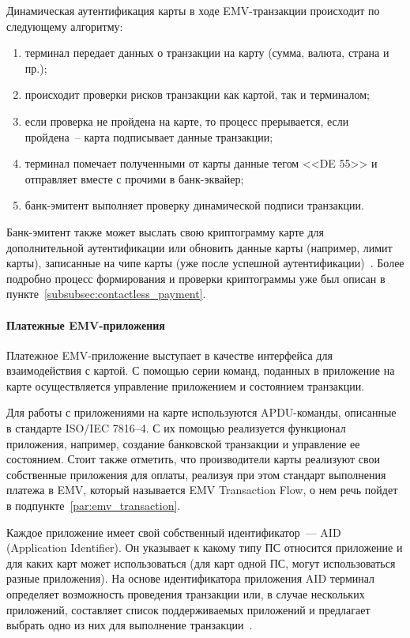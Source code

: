 Динамическая аутентификация карты в ходе EMV-транзакции происходит по следующему алгоритму:

\begin{enumerate}
    \item терминал передает данных о транзакции на карту (сумма, валюта, страна и пр.);
    \item происходит проверки рисков транзакции как картой, так и терминалом;
    \item если проверка не пройдена на карте, то процесс прерывается, если пройдена~-- карта подписывает данные транзакции;
    \item терминал помечает полученными от карты данные тегом <<DE 55>> и отправляет вместе с прочими в банк-эквайер;
    \item банк-эмитент выполняет проверку динамической подписи транзакции.
\end{enumerate}

Банк-эмитент также может выслать свою криптограмму карте для дополнительной аутентификации или обновить данные карты (например, лимит карты), записанные на чипе карты (уже после успешной аутентификации)~\cite{emv_book_2}.
Более подробно процесс формирования и проверки криптограммы уже был описан в пункте~\ref{subsubsec:contactless_payment}.


\paragraph{Платежные EMV-приложения}

Платежное EMV-приложение выступает в качестве интерфейса для взаимодействия с картой.
С помощью серии команд, поданных в приложение на карте осуществляется управление приложением и состоянием транзакции.

Для работы с приложениями на карте используются APDU-команды, описанные в стандарте ISO/IEC 7816--4.
С их помощью реализуется функционал приложения, например, создание банковской транзакции и управление ее состоянием.
Стоит также отметить, что производители карты реализуют свои собственные приложения для оплаты, реализуя при этом стандарт выполнения платежа в EMV, который называется EMV Transaction Flow, о нем речь пойдет в подпункте~\ref{par:emv_transaction}.

Каждое приложение имеет свой собственный идентификатор~--- AID (Application Identifier).
Он указывает к какому типу ПС относится приложение и для каких карт может использоваться (для карт одной ПС, могут использоваться разные приложения).
На основе идентификатора приложения AID терминал определяет возможность проведения транзакции или, в случае нескольких приложений, составляет список поддерживаемых приложений и предлагает выбрать одно из них для выполнение транзакции~\cite{emv_card_mechanism}.



